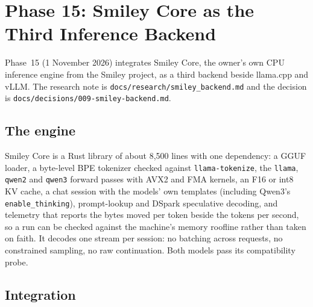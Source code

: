 \section{Phase 15: Smiley Core as the Third Inference Backend}
\label{sec:phase15}

Phase~15 (1 November 2026) integrates Smiley Core, the owner's own CPU inference engine from the Smiley project, as a third
backend beside llama.cpp and vLLM. The research note is \texttt{docs/research/smiley\_backend.md} and the decision is
\texttt{docs/decisions/009-smiley-backend.md}.

\subsection{The engine}

Smiley Core is a Rust library of about 8,500 lines with one dependency: a GGUF loader, a byte-level BPE tokenizer checked
against \texttt{llama-tokenize}, the \texttt{llama}, \texttt{qwen2} and \texttt{qwen3} forward passes with AVX2 and FMA
kernels, an F16 or int8 KV cache, a chat session with the models' own templates (including Qwen3's \texttt{enable\_thinking}),
prompt-lookup and DSpark speculative decoding, and telemetry that reports the bytes moved per token beside the tokens per
second, so a run can be checked against the machine's memory roofline rather than taken on faith. It decodes one stream per
session: no batching across requests, no constrained sampling, no raw continuation. Both \Sys{} models pass its compatibility
probe.

\subsection{Integration}

